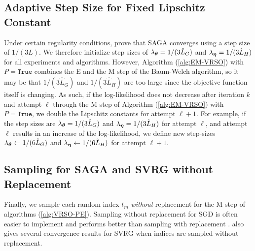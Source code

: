 \subsection{Adaptive Step Size for Fixed Lipschitz Constant}
\label{subsec:L_divider}

Under certain regularity conditions, \citet{Defazio:2014} prove that SAGA converges using a step size of $1/(3L)$. We therefore initialize step sizes of $\lambda_{\boldsymbol{\theta}} = 1/(3 \hat L_G)$ and $\lambda_{\boldsymbol{\eta}} = 1/(3 \hat L_H)$ for all experiments and algorithms. However, Algorithm (\ref{alg:EM-VRSO}) with $P = \texttt{True}$ combines the E and the M step of the Baum-Welch algorithm, so it may be that $1/(3 \hat L_G)$ and $1/(3 \hat L_H)$ are too large since the objective function itself is changing. As such, if the log-likelihood does not decrease after iteration $k$ and attempt $\ell$ through the M step of Algorithm (\ref{alg:EM-VRSO}) with $P = \texttt{True}$, we double the Lipschitz constants for attempt $\ell+1$. For example, if the step sizes are $\lambda_{\boldsymbol{\theta}} = 1/(3 \hat L_G)$ and $\lambda_{\boldsymbol{\eta}} = 1/(3 \hat L_H)$ for attempt $\ell$, and attempt $\ell$ results in an increase of the log-likelihood, we define new step-sizes $\lambda_{\boldsymbol{\theta}} \leftarrow 1/(6 \hat L_G)$ and $\lambda_{\boldsymbol{\eta}} \leftarrow 1/(6 \hat L_H)$ for attempt $\ell+1$.

\subsection{Sampling for SAGA and SVRG without Replacement}
\label{subsec:wo_replacement}

Finally, we sample each random index $t_{m}$ \textit{without} replacement for the M step of algorithms (\ref{alg:VRSO-PE}). Sampling without replacement for SGD is often easier to implement and performs better than sampling with replacement \citep{Gurbuzbalaban:2015}. \citet{Ohad:2016} also gives several convergence results for SVRG when indices are sampled without replacement.